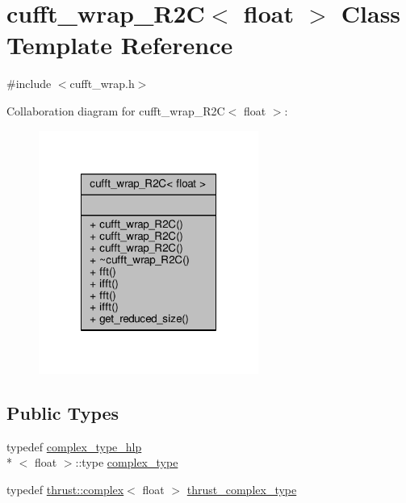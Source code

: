 \hypertarget{classcufft__wrap__R2C_3_01float_01_4}{\section{cufft\-\_\-wrap\-\_\-\-R2\-C$<$ float $>$ Class Template Reference}
\label{classcufft__wrap__R2C_3_01float_01_4}
}


{\ttfamily \#include $<$cufft\-\_\-wrap.\-h$>$}



Collaboration diagram for cufft\-\_\-wrap\-\_\-\-R2\-C$<$ float $>$\-:
\nopagebreak
\begin{figure}[H]
\begin{center}
\leavevmode
\includegraphics[width=204pt]{classcufft__wrap__R2C_3_01float_01_4__coll__graph}
\end{center}
\end{figure}
\subsection*{Public Types}
\begin{DoxyCompactItemize}
\item 
typedef \hyperlink{structcomplex__type__hlp}{complex\-\_\-type\-\_\-hlp}\\*
$<$ float $>$\-::type \hyperlink{classcufft__wrap__R2C_3_01float_01_4_a440b94a9e77e57995d6667008b1b4adc}{complex\-\_\-type}
\item 
typedef \hyperlink{test__deflation__typedefs_8h_a25cabcac5deb559feab415e2c445d8ba}{thrust\-::complex}$<$ float $>$ \hyperlink{classcufft__wrap__R2C_3_01float_01_4_a6b4db0bf9b878d0d81cfbe7b84d1c5d3}{thrust\-\_\-complex\-\_\-type}
\end{DoxyCompactItemize}
